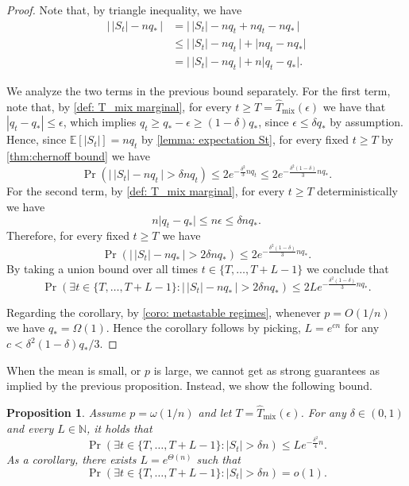\documentclass[11pt,a4paper]{article}
\newtheorem{proposition}[theorem]{Proposition}
\newcommand{\E}{\mathbb{E}}
\newcommand{\Tmar}{\hat{T}_{\mathrm{mix}}}
\begin{document}
\begin{proof}
Note that, by triangle inequality, we have
\begin{align*}
    \big|\, |S_t| - nq_* \,\big|
    &= \big|\, |S_t| -nq_t + nq_t - nq_* \,\big|
    \\
    &\le \big|\, |S_t| - nq_t \,\big| + \big| nq_t - nq_* \big|
    \\
    &= \big|\, |S_t| - nq_t \,\big| + n \big| q_t - q_* \big|.
\end{align*}

We analyze the two terms in the previous bound separately. 
For the first term, note that, by \cref{def: T_mix marginal}, for every $t \ge T = \Tmar(\epsilon)$ we have that $|q_t - q_*| \le \epsilon$, which implies $q_t \ge q_* - \epsilon \ge (1-\delta) q_*$, since $\epsilon \le \delta q_*$ by assumption.
Hence, since $\E[|S_t|]=nq_t$ by \cref{lemma: expectation St}, for every fixed $t \ge T$ by \cref{thm:chernoff bound} we have
\begin{equation*}
    \Pr\left( \big|\, |S_t| - nq_t \,\big| > \delta nq_t \right)
    \le 2e^{-\frac{\delta^2}{3}nq_t}
    \le 2e^{-\frac{\delta^2(1-\delta)}{3}nq_*}.
\end{equation*}
For the second term, by \cref{def: T_mix marginal}, for every $t \ge T$ deterministically we have
\[
    n \big| q_t - q_* \big| 
    \le n \epsilon
    \le \delta n q_*.
\]
Therefore, for every fixed $t \ge T$ we have
\[
    \Pr( \big|\, |S_t| - nq_* \,\big| > 2\delta nq_*  )
    \le 2 e^{- \frac{\delta^2(1-\delta)}{3} nq_*}.
\]
By taking a union bound over all times $t \in \{T,\ldots,T+L-1\}$ we conclude that
\[
    \Pr( \exists t \in \{T,\ldots,T+L-1\} : 
    \big|\, |S_t| - nq_* \,\big| > 2\delta nq_* )
    \le 2L e^{- \frac{\delta^2(1-\delta)}{3} nq_*}.
\]

Regarding the corollary, by \cref{coro: metastable regimes}, whenever $p=O(1/n)$ we have $q_* = \Omega(1)$. 
Hence the corollary follows by picking, $L = e^{cn}$ for any $c < \delta^2(1-\delta)q_* / 3$.
\end{proof}

When the mean is small, or $p$ is large, we cannot get as strong guarantees as implied by the previous proposition. 
Instead, we show the following bound.

\begin{proposition}\label{prop:metastability large p}
Assume $p = \omega(1/n)$ and let $T = \Tmar(\epsilon)$.
For any $\delta \in (0,1)$ and every $L \in \mathbb{N}$, it holds that 
\[
    \Pr\left(\exists t \in \{T,\ldots,T + L-1\} : |S_t| > \delta n \right) \le L e^{-\frac{\delta^2}{4}n}.
\]
As a corollary, there exists $L = e^{\Theta(n)}$ such that
\[
    \Pr\left(\exists t \in \{T,\ldots,T + L-1\} : |S_t| > \delta n \right) = o(1).
\]
\end{proposition}
\end{document}
